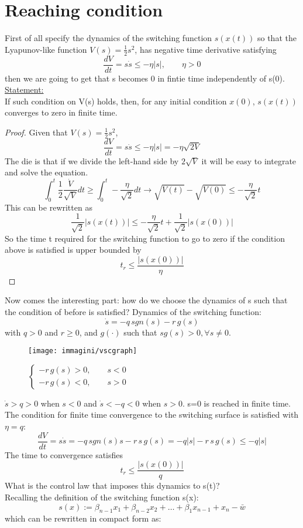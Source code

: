 \section{Reaching condition}
First of all specify the dynamics of the switching function $s(x(t))$ so that the Lyapunov-like function $V(s)=\frac{1}{2}s^2$, has negative time derivative satisfying \[\frac{dV}{dt}=s\dot{s}\le -\eta |s|,\qquad \eta>0\] then we are going to get that s becomes 0 in fintie time independently of s(0).\\
\underline{Statement:}\\ If such condition on V(s) holds, then, for any initial condition $x(0)$, $s(x(t))$ converges to zero in finite time.
\begin{proof}
	Given that $V(s)=\frac{1}{2}s^2$, \[\frac{dV}{dt}=s\dot{s}\le -\eta |s|=-\eta\sqrt{2V}\]The die is that if we divide the left-hand side by $2\sqrt{V}$ it will be easy to integrate and solve the equation.\[
	\int_{0}^{t}\frac{1}{2}\frac{\dot{V}}{\sqrt{V}}dt\ge\int_{0}^{t}- \frac{\eta}{\sqrt{2}}dt\to\sqrt{V(t)}-\sqrt{V(0)}\le-\frac{\eta}{\sqrt{2}}t
\] This can be rewritten as \[
\frac{1}{\sqrt{2}}|s(x(t))|\le -\frac{\eta}{\sqrt{2}}t+\frac{1}{\sqrt{2}}|s(x(0))|
\]So the time t required for the switching function to go to zero if the condition above is satisfied is upper bounded by \[t_r\le\frac{|s(x(0))|}{\eta}\]
\end{proof}
Now comes the  interesting part: how do we choose the dynamics of s such that the condition of before is satisfied?
Dynamics of the switching function:
\[\dot{s}=-q \, sgn(s)-r \, g(s)\] with $q>0$ and $r\ge0$, and $g(\cdot)$ such that $sg(s)>0,\forall s\neq 0$.\begin{figure}[H]
	\centering
	\texttt{[image: immagini/vscgraph]}
	\caption{$\begin{cases}-r \, g(s)>0,\qquad s<0\\-r \, g(s)<0,\qquad s>0\end{cases}$}
	\label{fig:vscgraph}
\end{figure}
$\dot{s}>q>0$ when $s<0$ and $\dot{s}<-q<0$ when $s>0$. s=0 is reached in finite time.\\The condition for finite time convergence to the switching surface is satisfied with $\eta=q$:\[
\frac{dV}{dt}=s\dot{s}=-q \, sgn(s)s-r \, s	\, g(s)=-q|s|-r	\, s \, g(s)\le-q|s|
\]The time to convergence satisfies \[t_r\le\frac{|s(x(0))|}{q}\]What is the control law that imposes this dynamics to s(t)?\\
Recalling the definition of the switching function s(x):\[s(x):=\beta_{n-1}x_1+\beta_{n-2}x_2+\dots+\beta_1x_{n-1}+x_n-\bar{w}\] which can be rewritten in compact form as:
